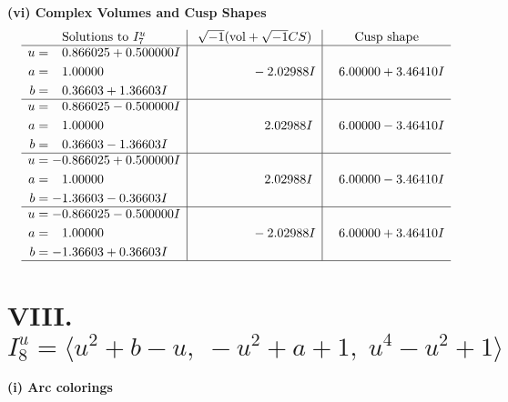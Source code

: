 \documentclass[1p]{elsarticle_modified}
\theoremstyle{definition}
\newcommand{\I}{\sqrt{-1}}
\begin{document}
\newpage\flushleft \textbf{(vi) Complex Volumes and Cusp Shapes}
$$\begin{array}{c|c|c}  
\text{Solutions to }I^u_{7}& \I (\text{vol} + \sqrt{-1}CS) & \text{Cusp shape}\\
 \hline 
\begin{aligned}
u &= \phantom{-}0.866025 + 0.500000 I \\
a &= \phantom{-}1.00000\phantom{ +0.000000I} \\
b &= \phantom{-}0.36603 + 1.36603 I\end{aligned}
 & \phantom{-0.000000 } -2.02988 I & \phantom{-}6.00000 + 3.46410 I \\ \hline\begin{aligned}
u &= \phantom{-}0.866025 - 0.500000 I \\
a &= \phantom{-}1.00000\phantom{ +0.000000I} \\
b &= \phantom{-}0.36603 - 1.36603 I\end{aligned}
 & \phantom{-0.000000 -}2.02988 I & \phantom{-}6.00000 - 3.46410 I \\ \hline\begin{aligned}
u &= -0.866025 + 0.500000 I \\
a &= \phantom{-}1.00000\phantom{ +0.000000I} \\
b &= -1.36603 - 0.36603 I\end{aligned}
 & \phantom{-0.000000 -}2.02988 I & \phantom{-}6.00000 - 3.46410 I \\ \hline\begin{aligned}
u &= -0.866025 - 0.500000 I \\
a &= \phantom{-}1.00000\phantom{ +0.000000I} \\
b &= -1.36603 + 0.36603 I\end{aligned}
 & \phantom{-0.000000 } -2.02988 I & \phantom{-}6.00000 + 3.46410 I\\
 \hline 
 \end{array}$$\newpage\newpage\renewcommand{\arraystretch}{1}
\centering \section*{VIII. $I^u_{8}= \langle u^2+b- u,\;- u^2+a+1,\;u^4- u^2+1 \rangle$}
\flushleft \textbf{(i) Arc colorings}\\
\end{document}
